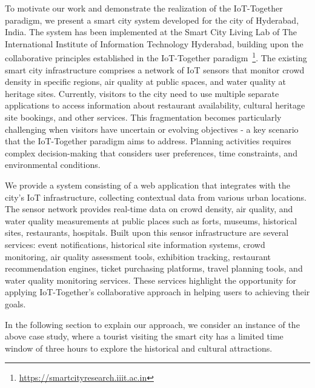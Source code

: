 To motivate our work and demonstrate the realization of the IoT-Together paradigm, we present a smart city system developed for the city of Hyderabad, India. The system has been implemented at the Smart City Living Lab of The International Institute of Information Technology Hyderabad, building upon the collaborative principles established in the IoT-Together paradigm~\footnote{\url{https://smartcityresearch.iiit.ac.in}}. The existing smart city infrastructure comprises a network of IoT sensors that monitor crowd density in specific regions, air quality at public spaces, and water quality at heritage sites. Currently, visitors to the city need to use multiple separate applications to access information about restaurant availability, cultural heritage site bookings, and other services. This fragmentation becomes particularly challenging when visitors have uncertain or evolving objectives - a key scenario that the IoT-Together paradigm aims to address. Planning activities requires complex decision-making that considers user preferences, time constraints, and environmental conditions.

We provide a system consisting of a web application that integrates with the city's IoT infrastructure, collecting contextual data from various urban locations. The sensor network provides real-time data on crowd density, air quality, and water quality measurements at public places such as forts, museums, historical sites, restaurants, hospitals. Built upon this sensor infrastructure are several services: event notifications, historical site information systems, crowd monitoring, air quality assessment tools, exhibition tracking, restaurant recommendation engines, ticket purchasing platforms, travel planning tools, and water quality monitoring services. These services highlight the opportunity for applying IoT-Together's collaborative approach in helping users to achieving their goals.

\noindent In the following section to explain our approach, we consider an instance of the above case study, where a tourist visiting the smart city has a limited time window of three hours to explore the historical and cultural attractions.

 









